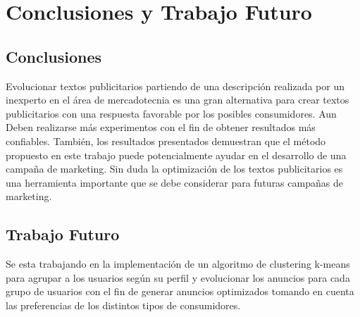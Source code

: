 
\chapter{Conclusiones y Trabajo Futuro}


\section{Conclusiones}

Evolucionar textos publicitarios partiendo de una descripción realizada por un inexperto en el área de mercadotecnia es una gran alternativa para crear textos publicitarios con una respuesta favorable por los posibles consumidores. Aun Deben realizarse más experimentos con el fin de obtener resultados más confiables. También, los resultados presentados demuestran que el método propuesto en este trabajo puede potencialmente ayudar en el desarrollo de una campaña de marketing.
Sin duda la optimización de los textos publicitarios es una herramienta importante que se debe considerar para futuras campañas de marketing.

\clearpage
\section{Trabajo Futuro}

Se esta trabajando en la implementación de un algoritmo de clustering k-means para agrupar a los usuarios según su perfil y evolucionar los anuncios para cada grupo de usuarios con el fin de generar anuncios optimizados tomando en cuenta las preferencias de los distintos tipos de consumidores.